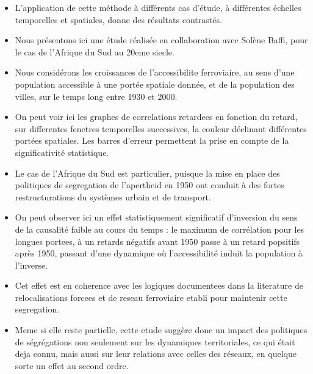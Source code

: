 \documentclass[12pt]{article}
\begin{document}
\begin{itemize}
	\item L'application de cette méthode à différents cas d'étude, à différentes échelles temporelles et spatiales, donne des résultats contrastés.
	\item Nous présentons ici une étude réalisée en collaboration avec Solène Baffi, pour le cas de l'Afrique du Sud au 20eme siecle.
	\item Nous considérons les croissances de l'accessibilite ferroviaire, au sens d'une population accessible à une portée spatiale donnée, et de la population des villes, sur le temps long entre 1930 et 2000.
	\item On peut voir ici les graphes de correlations retardees en fonction du retard, sur differentes fenetres temporelles successives, la couleur déclinant différentes portées spatiales. Les barres d'erreur permettent la prise en compte de la significativité statistique.
	\item Le cas de l'Afrique du Sud est particulier, puisque la mise en place des politiques de segregation de l'apertheid en 1950 ont conduit à des fortes restructurations du systèmes urbain et de transport. 
	\item On peut observer ici un effet statistiquement significatif d'inversion du sens de la causalité faible au cours du temps : le maximum de corrélation pour les longues portees, à un retards négatifs avant 1950 passe à un retard popsitifs après 1950, passant d'une dynamique où l'accessibilité induit la population à l'inverse.
	\item Cet effet est en coherence avec les logiques documentees dans la literature de relocalisations forcees et de reseau ferroviaire etabli pour maintenir cette segregation.
	\item Meme si elle reste partielle, cette etude suggère donc un impact des politiques de ségrégations non seulement sur les dynamiques territoriales, ce qui était deja connu, mais aussi sur leur relations avec celles des réseaux, en quelque sorte un effet au second ordre.
\end{itemize}

	
\end{document}
